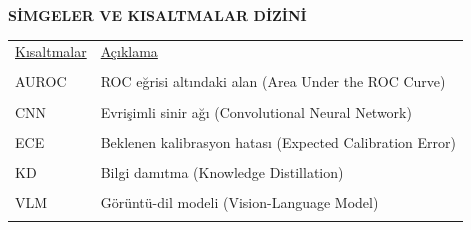 \begin{center}\textbf{SİMGELER VE KISALTMALAR DİZİNİ}\end{center}
\begin{tabular}{l l}
\underline{Kısaltmalar} & \hspace{1cm}\underline{Açıklama} \\ \\
AUROC & \hspace{1cm} ROC eğrisi altındaki alan (Area Under the ROC Curve)\\ \\
CNN & \hspace{1cm} Evrişimli sinir ağı (Convolutional Neural Network)\\ \\
ECE & \hspace{1cm} Beklenen kalibrasyon hatası (Expected Calibration Error)\\ \\
KD & \hspace{1cm} Bilgi damıtma (Knowledge Distillation)\\ \\
VLM & \hspace{1cm} Görüntü-dil modeli (Vision-Language Model)\\ \\
\end{tabular}
